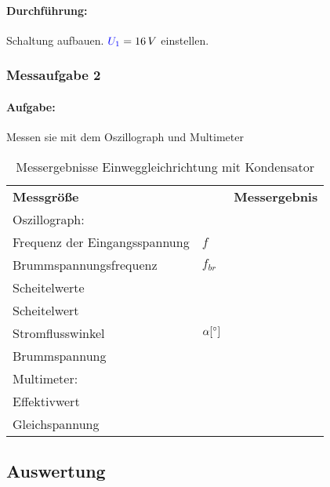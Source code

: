 \documentclass[11pt,a4paper,titlepage,parskip=half]{scrreprt}
\begin{document}
					\paragraph{Durchführung:} Schaltung aufbauen. $\textcolor{blue}{U_1} = 16\,V$ einstellen.\\ 		

				\subsubsection{Messaufgabe 2}
					\paragraph{Aufgabe:} Messen sie mit dem Oszillograph und Multimeter
					\begin{table}[H]
						\caption{Messergebnisse Einweggleichrichtung mit Kondensator}
						\label{tbl:messergebnisse1.2}
						\renewcommand{\arraystretch}{1.6}
                        \begin{center}
						\begin{tabular}{ll|l}
							\multicolumn{2}{l}{\textbf{Messgröße}} & \textbf{Messergebnis}\\
                                                        \multicolumn{3}{l}{Oszillograph:}\\\hline
							Frequenz der Eingangsspannung & $f$ & \\\hline
							Brummspannungsfrequenz & $f_{br}$ &\\\hline
							Scheitelwerte & \spannung{$U_{1_{max}}$} &\\\hline
							Scheitelwert & \spannung{$U_{2_{max}}$} &\\\hline
							Stromflusswinkel &  $\alpha [ \degree]$&\\\hline
							Brummspannung &  \spannung{$U_{brmax}$} &\\\hline
                            \multicolumn{3}{l}{Multimeter:}\\\hline
							Effektivwert & \spannung{$U_{1}$} &\\\hline
							Gleichspannung & \spannung{$U_{2-}$} &\\
						\end{tabular}
                    \end{center}
					\end{table}
			\subsection{Auswertung}
\end{document}
